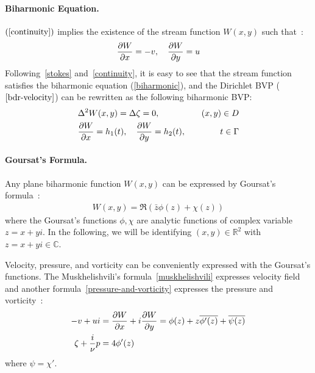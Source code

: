 \documentclass[10pt,twocolumn,letterpaper]{article}
\begin{document}
\paragraph{Biharmonic Equation.} 
$(\ref{continuity})$ implies the existence of the stream function $W(x,y)$ 
such that~\cite{greengardIntegralEquationMethods1996}:
\begin{align}
  \pdv{W}{x} = -v,\quad \pdv{W}{y} = u \label{stream-1}
\end{align}
Following~\eqref{stokes} and~\eqref{continuity}, 
it is easy to see that the stream function 
satisfies the biharmonic equation (\ref{biharmonic}), 
and the Dirichlet BVP ($\ref{bdr-velocity}$) can be rewritten 
as the following biharmonic BVP:
\begin{align}
   & \Delta^2 W(x,y) = \Delta \zeta = 0,                        & (x,y)\in D \label{biharmonic} \\
   & \pdv{W}{x}(t) = h_1(t),\quad \pdv{W}{y}(t) = h_2(t), \quad & t\in \Gamma\label{bih-bv}
\end{align}

\paragraph{Goursat's Formula.} 
Any plane biharmonic function $W(x,y)$ can be expressed by 
Goursat's formula~\cite{muskhelishviliBasicProblemsMathematical1977}:
\begin{align}
  W(x,y) = \Re (\bar z \phi(z) + \chi (z)) \label{Goursat}
\end{align}
where the Goursat's functions $\phi, \chi$ are analytic functions of complex variable $z = x+yi$.
In the following, we will be identifying $(x,y) \in \mathbb{R}^2$ with $z=x + yi \in \mathbb{C}$.

Velocity, pressure, and vorticity can be conveniently expressed with the Goursat's functions. 
The Muskhelishvili's formula~\eqref{muskhelishvili} expresses velocity field 
and another formula~\eqref{pressure-and-vorticity}
expresses the pressure and vorticity~\cite{muskhelishviliBasicProblemsMathematical1977}:
\begin{align}
  -v + u i & 
    = \pdv{W}{x} + i\pdv{W}{y}
    = \phi(z) + z \overline{\phi'(z)} + \overline{\psi(z)}
    \label{muskhelishvili}\\
  \zeta + \frac{i}{\nu}p & 
    = 4\phi'(z) \label{pressure-and-vorticity}
\end{align} where $\psi = \chi'$.
\end{document}
